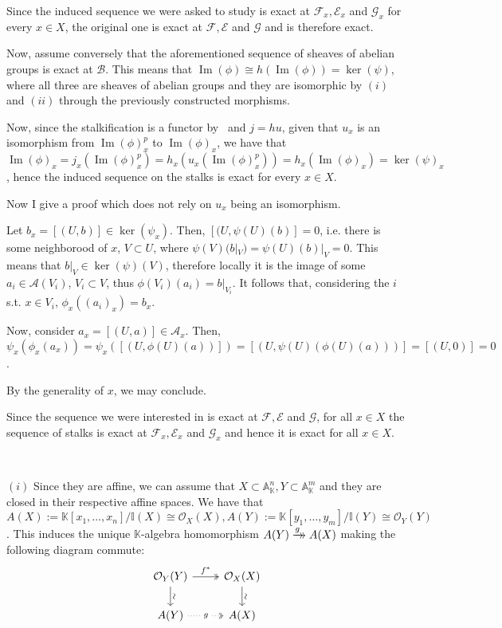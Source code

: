 \documentclass{article}
\newcommand{\numberset}{\mathbb}
\newcommand{\K}{\numberset{K}}
\newcommand{\I}{\mathbb{I}}
\newcommand{\A}{\mathbb{A}}
\newcommand{\exercise}[1]{\noindent {\bf Exercise #1}}
\newcommand*{\isoarrow}[1]{\arrow[#1,"\rotatebox{90}{\(\sim\)}"]}
\newcommand\dhxrightarrow[2][]{%
		\mathrel{\ooalign{$\xrightarrow[#1\mkern4mu]{#2\mkern4mu}$\cr%
		\hidewidth$\rightarrow\mkern4mu$}}
}
\DeclareMathOperator{\Ima}{Im}
\begin{document}
Since the induced sequence we were asked to study is exact at $\mathcal{F}_x,\mathcal{E}_x$ and $\mathcal{G}_x$ for every $x\in X$, the original one is exact at $\mathcal{F},\mathcal{E}$ and $\mathcal{G}$ and is therefore exact.

Now, assume conversely that the aforementioned sequence of sheaves of abelian groups is exact at $\mathcal{B}$. This means that $\Ima(\phi)\cong h(\Ima(\phi))=\ker(\psi)$, where all three are sheaves of abelian groups and they are isomorphic by $(i)$ and $(ii)$ through the previously constructed morphisms.

Now, since the stalkification is a functor by~\cite[ex. 4.6.22]{edix} and $j=hu$, given that $u_x$ is an isomorphism from $\Ima(\phi)^p_x$ to $\Ima(\phi)_x$, we have that $\Ima(\phi)_x=j_x(\Ima(\phi)^p_x)=h_x(u_x(\Ima(\phi)^p_x))=h_x(\Ima(\phi)_x)=\ker(\psi)_x$, hence the induced sequence on the stalks is exact for every $x\in X$.

Now I give a proof which does not rely on $u_x$ being an isomorphism.

Let $b_x=[(U,b)]\in\ker(\psi_x)$. Then, $[(U,\psi(U)(b)]=0$, i.e. there is some neighborood of $x$, $V\subset U$, where $\psi(V)(b|_V)=\psi(U)(b)|_V=0$. This means that $b|_V\in\ker(\psi)(V)$, therefore locally it is the image of some $a_i\in\mathcal{A}(V_i)$, $V_i\subset V$, thus $\phi(V_i)(a_i)=b|_{V_i}$. It follows that, considering the $i$ s.t. $x\in V_i$, $\phi_x((a_i)_x)=b_x$.

Now, consider $a_x=[(U,a)]\in\mathcal{A}_x$. Then, $\psi_x(\phi_x(a_x))=\psi_x([(U,\phi(U)(a))])=[(U,\psi(U)(\phi(U)(a)))]=[(U,0)]=0$.

By the generality of $x$, we may conclude.

Since the sequence we were interested in is exact at $\mathcal{F},\mathcal{E}$ and $\mathcal{G}$, for all $x\in X$ the sequence of stalks is exact at $\mathcal{F}_x,\mathcal{E}_x$ and $\mathcal{G}_x$ and hence it is exact for all $x\in X$.

~\\
\exercise{5.5.2}

$(i)$ Since they are affine, we can assume that $X\subset\A^n_{\K},Y\subset\A^m_{\K}$ and they are closed in their respective affine spaces. We have that $A(X):=\K[x_1,\ldots,x_n]/\I(X)\cong\mathcal{O}_X(X),A(Y):=\K[y_1,\ldots,y_m]/\I(Y)\cong\mathcal{O}_Y(Y)$. This induces the unique $\K$-algebra homomorphism $A(Y)\dhxrightarrow{g} A(X)$ making the following diagram commute:
\[
\begin{tikzcd}
		\mathcal{O}_Y(Y) \arrow[above,two heads]{r}{f^*}
		\isoarrow{d}
		&\mathcal{O}_X(X) \isoarrow{d} \\
		A(Y) \arrow[dotted,two heads]{r}[description]{g}
		&A(X)
\end{tikzcd}
\]
\end{document}
